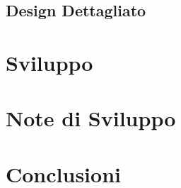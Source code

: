 \documentclass{article}
\begin{document}
  \subsection{Design Dettagliato}
  \section{Sviluppo}
  \section{Note di Sviluppo}
  \section{Conclusioni}
\end{document}
